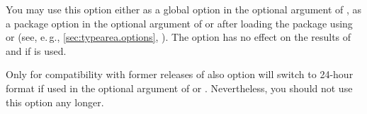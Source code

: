 You may use this option either as a global option in the optional argument of
, as a package option in the optional argument of
 or after loading the package using  or
 (see, e.\,g., \autoref{sec:typearea.options},
).  The option has no effect on the
results of  and  if  is used.

Only for compatibility with former releases of
 also option  will switch to 24-hour format if
used in the optional argument of  or
. Nevertheless, you should not use this option any longer.%
%
%
%

\endinput


